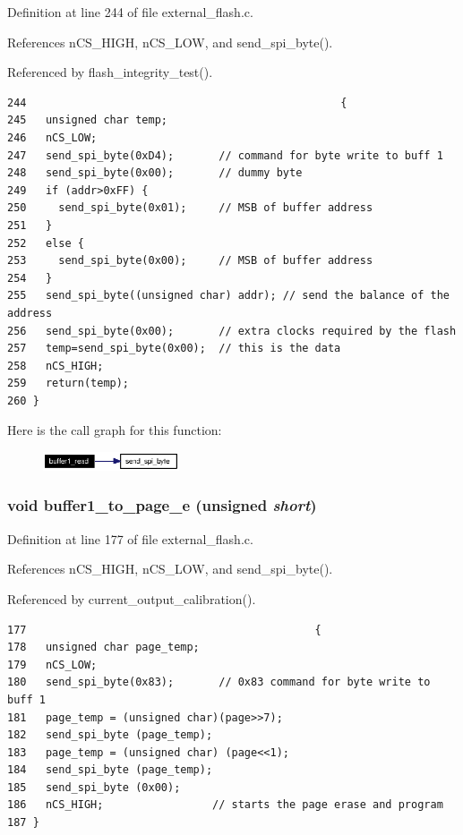 Definition at line 244 of file external\_\-flash.c.

References n\-CS\_\-HIGH, n\-CS\_\-LOW, and send\_\-spi\_\-byte().

Referenced by flash\_\-integrity\_\-test().

\footnotesize\begin{verbatim}244                                                 {
245   unsigned char temp;
246   nCS_LOW;
247   send_spi_byte(0xD4);       // command for byte write to buff 1
248   send_spi_byte(0x00);       // dummy byte
249   if (addr>0xFF) {
250     send_spi_byte(0x01);     // MSB of buffer address
251   }
252   else {
253     send_spi_byte(0x00);     // MSB of buffer address
254   }  
255   send_spi_byte((unsigned char) addr); // send the balance of the address
256   send_spi_byte(0x00);       // extra clocks required by the flash
257   temp=send_spi_byte(0x00);  // this is the data 
258   nCS_HIGH; 
259   return(temp);
260 }
\end{verbatim}\normalsize 




Here is the call graph for this function:\begin{figure}[H]
\begin{center}
\leavevmode
\includegraphics[width=114pt]{external__flash_8h_a15_cgraph}
\end{center}
\end{figure}
\subsubsection{\setlength{\rightskip}{0pt plus 5cm}void buffer1\_\-to\_\-page\_\-e (unsigned {\em short})}\label{external__flash_8h_a10}




Definition at line 177 of file external\_\-flash.c.

References n\-CS\_\-HIGH, n\-CS\_\-LOW, and send\_\-spi\_\-byte().

Referenced by current\_\-output\_\-calibration().

\footnotesize\begin{verbatim}177                                             {
178   unsigned char page_temp;
179   nCS_LOW;
180   send_spi_byte(0x83);       // 0x83 command for byte write to buff 1
181   page_temp = (unsigned char)(page>>7);
182   send_spi_byte (page_temp);
183   page_temp = (unsigned char) (page<<1);
184   send_spi_byte (page_temp);
185   send_spi_byte (0x00);
186   nCS_HIGH;                 // starts the page erase and program 
187 }
\end{verbatim}\normalsize 




